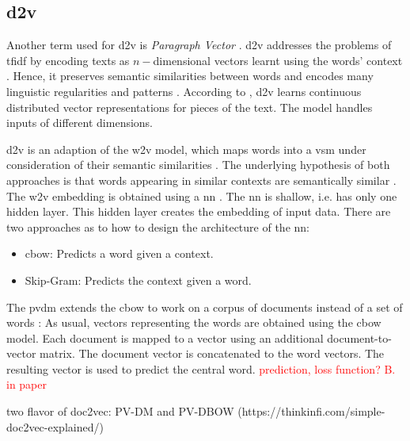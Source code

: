 \subsection{\ac{d2v}}\label{subsec:doc2vec}

Another term used for \ac{d2v} is \textit{Paragraph Vector} \cite{clusteringDocs2020}.
\ac{d2v} addresses the problems of \ac{tfidf} by encoding texts as $n-$dimensional vectors learnt using the words' context \cite{clusteringDocs2020}.
Hence, it preserves semantic similarities between words and encodes many linguistic regularities and patterns \cite{SkipGram2013}.
According to \citeauthor{clusteringDocs2020}, \ac{d2v} learns continuous distributed vector representations for pieces of the text.
The model handles inputs of different dimensions.

\ac{d2v} is an adaption of the \ac{w2v} model, which maps words into a \ac{vsm} under consideration of their semantic similarities \cite{clusteringDocs2020}.
The underlying hypothesis of both approaches is that words appearing in similar contexts are semantically similar \cite{clusteringDocs2020}.
The \ac{w2v} embedding is obtained using a \ac{nn} \cite{clusteringDocs2020}.
The \ac{nn} is shallow, i.e. has only one hidden layer.
This hidden layer creates the embedding of input data.
There are two approaches as to how to design the architecture of the \ac{nn}:
\begin{itemize}
    \item \ac{cbow}: 
        Predicts a word given a context.
    \item Skip-Gram: 
        Predicts the context given a word.
\end{itemize}

The \ac{pvdm} extends the \ac{cbow} to work on a corpus of documents instead of a set of words \cite{clusteringDocs2020}:
As usual, vectors representing the words are obtained using the \ac{cbow} model.
Each document is mapped to a vector using an additional document-to-vector matrix.
The document vector is concatenated to the word vectors.
The resulting vector is used to predict the central word.
\textcolor{red}{prediction, loss function? B. in paper}



\cite{SentRep2014}
two flavor of doc2vec: PV-DM and PV-DBOW (https://thinkinfi.com/simple-doc2vec-explained/)
\cite{SkipGram2013}